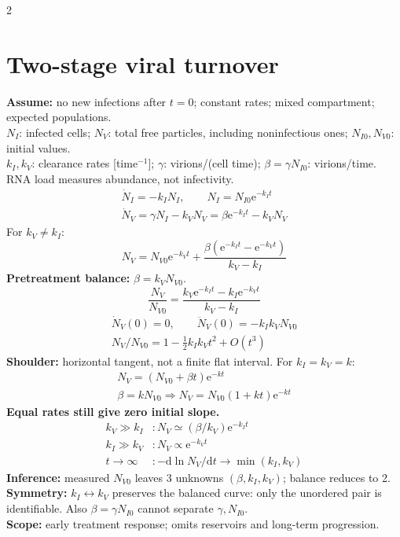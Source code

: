 \documentclass[10pt,a4paper]{scrartcl}
\newcommand{\dd}{\mathrm{d}}
\newcommand{\ee}{\mathrm{e}}
\begin{document}
\begin{multicols}{2}
\section*{Two-stage viral turnover}
\textbf{Assume:} no new infections after $t=0$; constant rates; mixed compartment; expected populations.\\
$N_I$: infected cells; $N_V$: total free particles, including noninfectious ones; $N_{I0},N_{V0}$: initial values.\\
$k_I,k_V$: clearance rates [time$^{-1}$]; $\gamma$: virions/(cell time); $\beta=\gamma N_{I0}$: virions/time. RNA load measures abundance, not infectivity.
\begin{gather*}
\dot N_I=-k_IN_I,\qquad N_I=N_{I0}\ee^{-k_It}\\
\dot N_V=\gamma N_I-k_VN_V=\beta\ee^{-k_It}-k_VN_V
\end{gather*}
For $k_V\ne k_I$:
\begin{equation*}
N_V=N_{V0}\ee^{-k_Vt}
+\frac{\beta(\ee^{-k_It}-\ee^{-k_Vt})}{k_V-k_I}
\end{equation*}
\textbf{Pretreatment balance:} $\beta=k_VN_{V0}$.
\begin{equation*}
\frac{N_V}{N_{V0}}=\frac{k_V\ee^{-k_It}-k_I\ee^{-k_Vt}}{k_V-k_I}
\end{equation*}
\begin{gather*}
\dot N_V(0)=0,\qquad \ddot N_V(0)=-k_Ik_VN_{V0}\\
N_V/N_{V0}=1-\tfrac12k_Ik_Vt^2+O(t^3)
\end{gather*}
\textbf{Shoulder:} horizontal tangent, not a finite flat interval.
For $k_I=k_V=k$:
\begin{gather*}
N_V=(N_{V0}+\beta t)\ee^{-kt}\\
\beta=kN_{V0}\Rightarrow N_V=N_{V0}(1+kt)\ee^{-kt}
\end{gather*}
\textbf{Equal rates still give zero initial slope.}
\begin{align*}
k_V\gg k_I &: N_V\simeq(\beta/k_V)\ee^{-k_It}\\
k_I\gg k_V &: N_V\propto\ee^{-k_Vt}\\
t\to\infty &: -\dd\ln N_V/\dd t\to\min(k_I,k_V)
\end{align*}
\textbf{Inference:} measured $N_{V0}$ leaves 3 unknowns $(\beta,k_I,k_V)$; balance reduces to 2.\\
\textbf{Symmetry:} $k_I\leftrightarrow k_V$ preserves the balanced curve: only the unordered pair is identifiable. Also $\beta=\gamma N_{I0}$ cannot separate $\gamma,N_{I0}$.\\
\textbf{Scope:} early treatment response; omits reservoirs and long-term progression.



\end{multicols}
\end{document}

